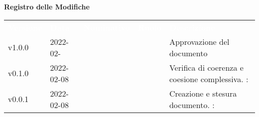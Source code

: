 

{\LARGE{\textbf{Registro delle Modifiche}}} \\
\begin{table}[!htbp]
\renewcommand{\arraystretch}{1.5}
\begin{tabular}{ m{}<{\centering}  m{}<{\centering}  m{}<{\centering}  m{}<{\centering}  m{}<{\centering} }
	\rowcolor{darkblue}
	\textcolor{white}{\textbf{Versione}} &\textcolor{white}{\textbf{Data}}& \textcolor{white}{\textbf{Nominativo}} & \textcolor{white}{\textbf{Ruolo}}&\textcolor{white}{\textbf{Descrizione}}\\ 

	v1.0.0 & 2022-02- & \ & \RE & Approvazione del documento \\

	v0.1.0& 2022-02-08 & \GC & \VE & Verifica di coerenza e coesione complessiva. \VE: \textit{\PV}\\

	v0.0.1& 2022-02-08& \GC &\AN & Creazione e stesura documento. \VE: \textit{\PV}\\

\end{tabular}
\end{table}

\pagebreak